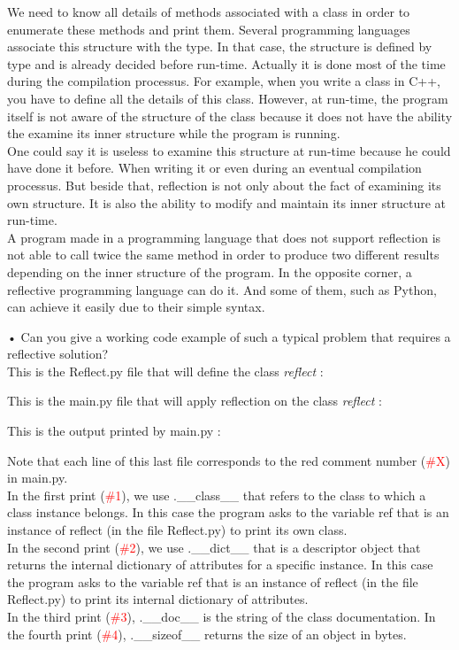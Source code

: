 We need to know all details of methods associated with a class in order to enumerate these methods and print them. Several programming languages associate this structure with the type. In that case, the structure is defined by type and is already decided before run-time. Actually it is done most of the time during the compilation processus. For example, when you write a class in C++, you have to define all the details of this class. However, at run-time, the program itself is not aware of the structure of the class because it does not have the ability the examine its inner structure while the program is running.\\
One could say it is useless to examine this structure at run-time because he could have done it before. When writing it or even during an eventual compilation processus. But beside that, reflection is not only about the fact of examining its own structure. It is also the ability to modify and maintain its inner structure at run-time.\\
A program made in a programming language that does not support reflection is not able to call twice the same method in order to produce two different results depending on the inner structure of the program. In the opposite corner, a reflective programming language can do it. And some of them, such as Python, can achieve it easily due to their simple syntax. \cite{assembleforce}
\newline


•	Can you give a working code example of such a typical problem that requires a reflective solution?\\

This is the Reflect.py file that will define the class \emph{reflect} :


This is the main.py file that will apply reflection on the class \emph{reflect} :


This is the output printed by main.py :

Note that each line of this last file corresponds to the red comment number (\textcolor{red}{\#X}) in main.py.\\ 
In the first print (\textcolor{red}{\#1}), we use .\_\_class\_\_ that refers to the class to which a class instance belongs. In this case the program asks to the variable ref that is an instance of reflect (in the file Reflect.py) to print its own class.\\
In the second print (\textcolor{red}{\#2}), we use .\_\_dict\_\_ that is a descriptor object that returns the internal dictionary of attributes for a specific instance. In this case the program asks to the variable ref that is an instance of reflect (in the file Reflect.py) to print its internal dictionary of attributes.\\
In the third print (\textcolor{red}{\#3}), .\_\_doc\_\_ is the string of the class documentation. 
In the fourth print (\textcolor{red}{\#4}), .\_\_sizeof\_\_ returns the size of an object in bytes.

